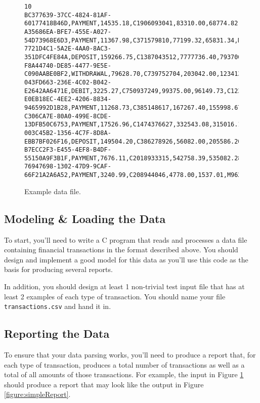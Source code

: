 \documentclass[12pt]{scrartcl}
\begin{document}
\begin{figure}[ht]
\begin{verbatim}
10
BC377639-37CC-4824-81AF-60177418B46D,PAYMENT,14535.18,C1906093041,83310.00,68774.82,M95867054
A35686EA-BFE7-455E-A027-54D73968E6D3,PAYMENT,11367.98,C371579810,77199.32,65831.34,M1932650331
7721D4C1-5A2E-4AA0-8AC3-351DFC4FE84A,DEPOSIT,159266.75,C1387043512,7777736.40,7937003.15,C553899299
F8A44740-DE85-4477-9E5E-C090AABE0BF2,WITHDRAWAL,79628.70,C739752704,203042.00,123413.30,C579345824
043FD663-236E-4C02-B042-E2642AA6471E,DEBIT,3225.27,C750937249,99375.00,96149.73,C1232504595
E0EB18EC-4EE2-4206-8834-9465992D1B28,PAYMENT,11268.73,C385148617,167267.40,155998.67,M1084205719
C306CA7E-80A0-499E-8CDE-13DFB50C6753,PAYMENT,17526.96,C1474376627,332543.08,315016.12,M1944361847
003C45B2-1356-4C7F-8D8A-EBB7BF026F16,DEPOSIT,149504.20,C386278926,56082.00,205586.20,C1113941243
B7ECC2F3-E455-4EF8-B4DF-55150A9F3B1F,PAYMENT,7676.11,C2018933315,542758.39,535082.28,M1018630839
76947698-1302-47D9-9CAF-66F21A2A6A52,PAYMENT,3240.99,C208944046,4778.00,1537.01,M962275185
\end{verbatim}
\caption{Example data file.}
\label{figure:dataFile}
\end{figure}

\subsection*{Modeling \& Loading the Data}

To start, you'll need to write a C program that reads and processes 
a data file containing financial transactions in the format described above.  
You should design and implement a good model for this data as you'll use 
this code as the basis for producing several reports.

In addition, you should design at least 1 non-trivial test input file that 
has at least 2 examples of each type of transaction.  You should name your
file \texttt{transactions.csv} and hand it in.

\subsection*{Reporting the Data}

To ensure that your data parsing works, you'll need to produce a report
that, for each type of transaction, produces a total number of transactions 
as well as a total of all amounts of those transactions.  For example, 
the input in Figure \ref{figure:dataFile} should produce a report that
may look like the output in Figure \ref{figure:simpleReport}.
\end{document}
